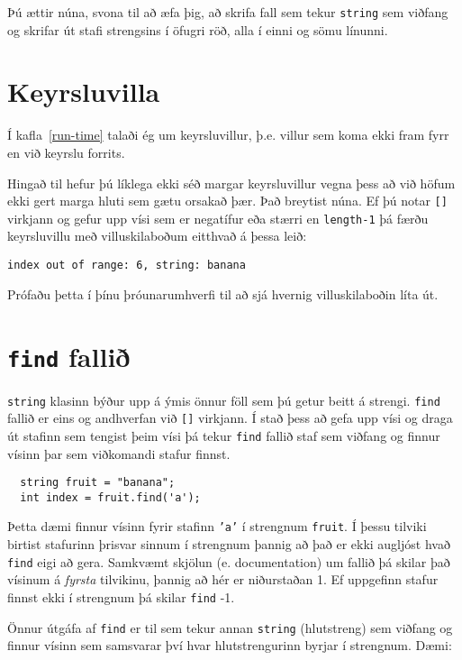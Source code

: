 Þú ættir núna, svona til að æfa þig, að skrifa fall sem tekur {\tt string} sem viðfang og skrifar út stafi strengsins í öfugri röð, alla í einni og sömu línunni.

\section{Keyrsluvilla}

Í kafla~\ref{run-time} talaði ég um keyrsluvillur, þ.e. villur sem koma ekki fram fyrr en við keyrslu forrits.

Hingað til hefur þú líklega ekki séð margar keyrsluvillur vegna þess að við höfum ekki gert marga hluti sem gætu orsakað þær.
Það breytist núna.
Ef þú notar {\tt []} virkjann og gefur upp vísi sem er negatífur eða stærri en {\tt length-1} þá færðu keyrsluvillu með villuskilaboðum eitthvað á þessa leið:

\begin{verbatim}
index out of range: 6, string: banana
\end{verbatim}
%
Prófaðu þetta í þínu þróunarumhverfi til að sjá hvernig villuskilaboðin líta út.

\section{{\tt find} fallið}

{\tt string} klasinn býður upp á ýmis önnur föll sem þú getur beitt á strengi.
{\tt find} fallið er eins og andhverfan við {\tt []} virkjann.
Í stað þess að gefa upp vísi og draga út stafinn sem tengist þeim vísi þá tekur {\tt find} fallið staf sem viðfang
og finnur vísinn þar sem viðkomandi stafur finnst.

\begin{verbatim}
  string fruit = "banana";
  int index = fruit.find('a');
\end{verbatim}
%
Þetta dæmi finnur vísinn fyrir stafinn {\tt 'a'} í strengnum {\tt fruit}.
Í þessu tilviki birtist stafurinn þrisvar sinnum í strengnum þannig að það er ekki augljóst hvað {\tt find} eigi að gera.
Samkvæmt skjölun (e. documentation) um fallið þá skilar það vísinum á {\em fyrsta} tilvikinu, þannig að hér er niðurstaðan 1.
Ef uppgefinn stafur finnst ekki í strengnum þá skilar {\tt find} -1.

Önnur útgáfa af {\tt find} er til sem tekur annan {\tt string} (hlutstreng) sem viðfang og finnur vísinn sem samsvarar því hvar hlutstrengurinn byrjar í strengnum.
Dæmi:

